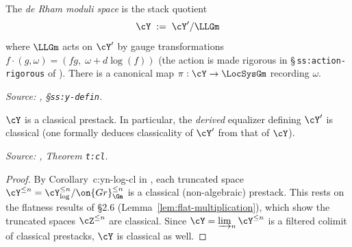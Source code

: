 \begin{definition}
  \label{def:Y}
  The \emph{de Rham moduli space} is the stack quotient
  \[
    \cY \;:=\; \cY' / \LLGm
  \]
  where $\LLGm$ acts on $\cY'$ by gauge transformations
  $f \cdot (g,\omega) = (fg,\; \omega + d\log(f))$ (the action is made
  rigorous in \S\,\texttt{ss:action-rigorous} of \cite{hilburn-raskin}).
  There is a canonical map $\pi : \cY \to \LocSysGm$ recording $\omega$.

  \textit{Source: \cite{hilburn-raskin}, \S\texttt{ss:y-defin}.}
\end{definition}

\begin{theorem}[$\cY$ is classical]
  \label{thm:Y-classical}
  $\cY$ is a classical prestack. In particular, the \emph{derived} equalizer
  defining $\cY'$ is classical (one formally deduces classicality of $\cY'$
  from that of $\cY$).

  \textit{Source: \cite{hilburn-raskin}, Theorem \texttt{t:cl}.}
\end{theorem}

\begin{proof}
  By Corollary~c:yn-log-cl in \cite{hilburn-raskin}, each truncated space
  $\cY^{\leq n} = \cY_{\log}^{\leq n}/\on{Gr}_{\Gm}^{\leq n}$ is a classical
  (non-algebraic) prestack. This rests on the flatness results of
  \S2.6 (Lemma~\ref{lem:flat-multiplication}), which show the truncated
  spaces $\cZ^{\leq n}$ are classical. Since $\cY = \varinjlim_n \cY^{\leq n}$
  is a filtered colimit of classical prestacks, $\cY$ is classical as well.
\end{proof}

